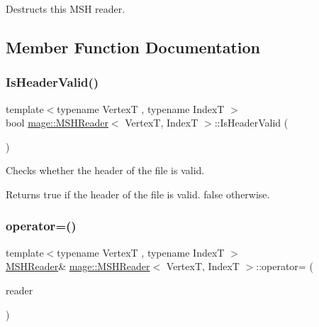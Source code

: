 Destructs this M\+SH reader. 

\subsection{Member Function Documentation}
\hypertarget{classmage_1_1_m_s_h_reader_a2bc2f2a6410de600c39336f4516a5231}{}\label{classmage_1_1_m_s_h_reader_a2bc2f2a6410de600c39336f4516a5231} 
\subsubsection{\texorpdfstring{Is\+Header\+Valid()}{IsHeaderValid()}}
{\footnotesize\ttfamily template$<$typename VertexT , typename IndexT $>$ \\
bool \hyperlink{classmage_1_1_m_s_h_reader}{mage\+::\+M\+S\+H\+Reader}$<$ VertexT, IndexT $>$\+::Is\+Header\+Valid (\begin{DoxyParamCaption}{ }\end{DoxyParamCaption})\hspace{0.3cm}{\ttfamily [private]}}

Checks whether the header of the file is valid.

\begin{DoxyReturn}{Returns}
{\ttfamily true} if the header of the file is valid. {\ttfamily false} otherwise. 
\end{DoxyReturn}
\hypertarget{classmage_1_1_m_s_h_reader_abbe36c0fcfbf0c909a45f974c34ecc3a}{}\label{classmage_1_1_m_s_h_reader_abbe36c0fcfbf0c909a45f974c34ecc3a} 
\subsubsection{\texorpdfstring{operator=()}{operator=()}\hspace{0.1cm}{\footnotesize\ttfamily [1/2]}}
{\footnotesize\ttfamily template$<$typename VertexT , typename IndexT $>$ \\
\hyperlink{classmage_1_1_m_s_h_reader}{M\+S\+H\+Reader}\& \hyperlink{classmage_1_1_m_s_h_reader}{mage\+::\+M\+S\+H\+Reader}$<$ VertexT, IndexT $>$\+::operator= (\begin{DoxyParamCaption}\item[{const \hyperlink{classmage_1_1_m_s_h_reader}{M\+S\+H\+Reader}$<$ VertexT, IndexT $>$ \&}]{reader }\end{DoxyParamCaption})\hspace{0.3cm}{\ttfamily [delete]}}

